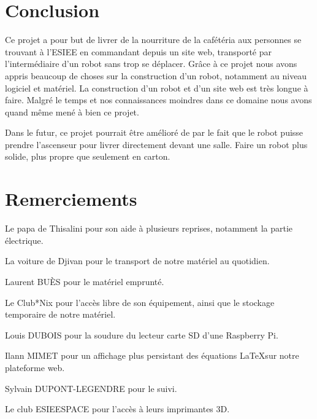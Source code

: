 \documentclass[a4paper,12pt]{report}  %
\begin{document}
\pagebreak
\section{Conclusion}

Ce projet a pour but de livrer de la nourriture de la cafétéria aux personnes se trouvant à l’ESIEE en commandant depuis un site web, transporté par l’intermédiaire d’un robot sans trop se déplacer. Grâce à ce projet nous avons appris beaucoup de choses sur la construction d’un robot, notamment au niveau logiciel et matériel. La construction d’un robot et d’un site web est très longue à faire. Malgré le temps et nos connaissances moindres dans ce domaine nous avons quand même mené à bien ce projet.

Dans le futur, ce projet pourrait être amélioré de par le fait que le robot puisse prendre l’ascenseur pour livrer directement devant une salle. Faire un robot plus solide, plus propre que seulement en carton.



\pagebreak
\section{Remerciements}
Le papa de Thisalini pour son aide à plusieurs reprises, notamment la partie électrique.

La voiture de Djivan pour le transport de notre matériel au quotidien. 

Laurent BUÈS pour le matériel emprunté. 

Le Club*Nix pour l’accès libre de son équipement, ainsi que le stockage temporaire de notre matériel. 

Louis DUBOIS pour la soudure du lecteur carte SD d’une Raspberry Pi. 

Ilann MIMET pour un affichage plus persistant des équations \LaTeX sur notre plateforme web. 

Sylvain DUPONT-LEGENDRE pour le suivi. 

Le club ESIEESPACE pour l'accès à leurs imprimantes 3D. 
\end{document}
